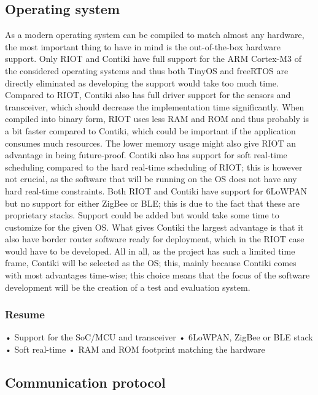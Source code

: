 \subsection{Operating system}

As a modern operating system can be compiled to match almost any hardware,
	the most important thing to have in mind is the out-of-the-box hardware support.
Only RIOT and Contiki have full support for the ARM Cortex-M3 of the considered operating systems and thus both TinyOS and freeRTOS are directly eliminated as developing the support would take too much time.
Compared to RIOT,
	Contiki also has full driver support for the sensors and transceiver,
	which should decrease the implementation time significantly.
When compiled into binary form,
	RIOT uses less RAM and ROM and thus probably is a bit faster compared to Contiki,
	which could be important if the application consumes much resources.
The lower memory usage might also give RIOT an advantage in being future-proof.
Contiki also has support for soft real-time scheduling compared to the hard real-time scheduling of RIOT;
	this is however not crucial,
	as the software that will be running on the OS does not have any hard real-time constraints.
Both RIOT and Contiki have support for 6LoWPAN but no support for either ZigBee or BLE;
	this is due to the fact that these are proprietary stacks.
Support could be added but would take some time to customize for the given OS.
What gives Contiki the largest advantage is that it also have border router software ready for deployment,
	which in the RIOT case would have to be developed.
All in all,
	as the project has such a limited time frame,
	Contiki will be selected as the OS;
	this,
	mainly because Contiki comes with most advantages time-wise;
	this choice means that the focus of the software development will be the creation of a test and evaluation system.

\subsubsection*{Resume}
• Support for the SoC/MCU and transceiver
• 6LoWPAN, ZigBee or BLE stack
• Soft real-time
• RAM and ROM footprint matching the hardware


\subsection{Communication protocol}


